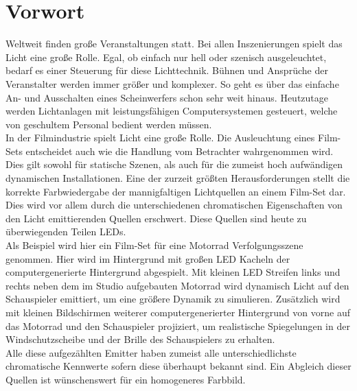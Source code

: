 \documentclass[11pt]{scrartcl}
\begin{document}
\section*{Vorwort}
Weltweit finden große Veranstaltungen statt. Bei allen Inszenierungen spielt das Licht eine 
große Rolle. Egal, ob einfach nur hell oder szenisch ausgeleuchtet, bedarf es einer Steuerung 
für diese Lichttechnik. Bühnen und Ansprüche der Veranstalter werden immer größer und komplexer. 
So geht es über das einfache An- und Ausschalten eines Scheinwerfers schon sehr weit hinaus. 
Heutzutage werden Lichtanlagen mit leistungsfähigen Computersystemen gesteuert, welche von 
geschultem Personal bedient werden müssen.\\
In der Filmindustrie spielt Licht eine große Rolle. Die Ausleuchtung eines Film-Sets entscheidet 
auch wie die Handlung vom Betrachter wahrgenommen wird. Dies gilt sowohl für statische Szenen, 
als auch für die zumeist hoch aufwändigen dynamischen Installationen.
Eine der zurzeit größten Herausforderungen stellt die korrekte Farbwiedergabe der mannigfaltigen 
Lichtquellen an einem Film-Set dar.
Dies wird vor allem durch die unterschiedenen chromatischen Eigenschaften von den Licht 
emittierenden Quellen erschwert. Diese Quellen sind heute zu überwiegenden Teilen LEDs.\\
Als Beispiel wird hier ein Film-Set für eine Motorrad Verfolgungsszene genommen. Hier wird im 
Hintergrund mit großen LED Kacheln der computergenerierte Hintergrund abgespielt. Mit kleinen 
LED Streifen links und rechts neben dem im Studio aufgebauten Motorrad wird dynamisch Licht auf 
den Schauspieler emittiert, um eine größere Dynamik zu simulieren.
Zusätzlich wird mit kleinen Bildschirmen weiterer computergenerierter Hintergrund von vorne auf 
das Motorrad und den Schauspieler projiziert, um realistische Spiegelungen in der 
Windschutzscheibe und der Brille des Schauspielers zu erhalten.\\
Alle diese aufgezählten Emitter haben zumeist alle unterschiedlichste chromatische Kennwerte 
sofern diese überhaupt bekannt sind. Ein Abgleich dieser Quellen ist wünschenswert für ein 
homogeneres Farbbild.

\end{document}
